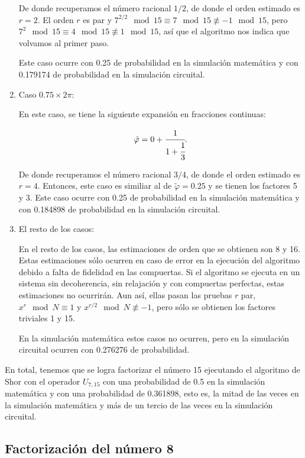 \begin{enumerate}
        De donde recuperamos el número racional $1/2$, de donde el orden estimado es $r = 2$. El orden $r$ es par y $7^{2/2}\mod 15 \equiv 7\mod 15 \not\equiv -1\mod 15$, pero $7^2\mod 15 \equiv 4\mod 15 \not\equiv 1\mod 15$, así que el algoritmo nos indica que volvamos al primer paso.

        Este caso ocurre con 0.25 de probabilidad en la simulación matemática y con 0.179174 de probabilidad en la simulación circuital.

    \item Caso $0.75 \times 2\pi$:

        En este caso, se tiene la siguiente expansión en fracciones continuas:

        \begin{equation}
            \tilde{\varphi} = 0 + \cfrac{1}{1 + \cfrac{1}{3}} .
        \end{equation}
        
        De donde recuperamos el número racional $3/4$, de donde el orden estimado es $r = 4$. Entonces, este caso es similiar al de $\tilde{\varphi} = 0.25$ y se tienen los factores 5 y 3. Este caso ocurre con 0.25 de probabilidad en la simulación matemática y con 0.184898 de probabilidad en la simulación circuital.

    \item El resto de los casos:

        En el resto de los casos, las estimaciones de orden que se obtienen son 8 y 16. Estas estimaciones sólo ocurren en caso de error en la ejecución del algoritmo debido a falta de fidelidad en las compuertas. Si el algoritmo se ejecuta en un sistema sin decoherencia, sin relajación y con compuertas perfectas, estas estimaciones no ocurrirán. Aun así, ellas pasan las pruebas $r$ par, $x^r \mod N \equiv 1$ y $x^{r/2} \mod N \not\equiv -1$, pero sólo se obtienen los factores triviales 1 y 15.

        En la simulación matemática estos casos no ocurren, pero en la simulación circuital ocurren con 0.276276 de probabilidad.
\end{enumerate}

En total, tenemos que se logra factorizar el número 15 ejecutando el algoritmo de Shor con el operador $U_{7,15}$ con una probabilidad de 0.5 en la simulación matemática y con una probabilidad de 0.361898, esto es, la mitad de las veces en la simulación matemática y más de un tercio de las veces en la simulación circuital.

\subsection{Factorización del número 8}

